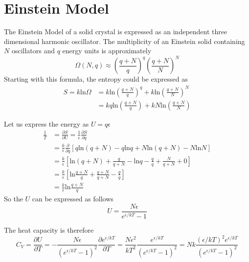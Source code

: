 
\section{Einstein Model}
The Einstein Model of a solid crystal is expressed as an independent three dimensional harmonic oscillator.
The multiplicity of an Einstein solid containing $N$ oscillators and $q$ energy units is approximately
\begin{equation} 
\Omega(N, q) \approx (\frac{q+N}{q})^q (\frac{q+N}{N})^N
\end{equation}
Starting with this formula, the entropy could be expressed as 
\begin{equation} 
\begin{split}
S = k\textrm{ln}\Omega &= k\textrm{ln}(\frac{q+N}{q})^q + k\textrm{ln}(\frac{q+N}{N})^N\\
                       &= kq\textrm{ln}(\frac{q+N}{q}) + kN\textrm{ln}(\frac{q+N}{N})
\end{split}
\end{equation}

Let us express the energy as $U = q\epsilon$ 
\begin{equation}
\begin{split}
\frac{1}{T} &= \frac{\partial S}{\partial U} = \frac{1}{\epsilon}\frac{\partial S}{\partial q} \\
            &= \frac{k}{\epsilon} \frac{\partial}{\partial q}[q\textrm{ln}(q+N) - q\textrm{ln}q + N\textrm{ln}(q+N) - N\textrm{ln}N] \\
            &= \frac{k}{\epsilon} [\textrm{ln}(q+N) + \frac{q}{q+N} - \textrm{ln}q  - \frac{q}{q} +  \frac{N}{q+N} + 0] \\
            &= \frac{k}{\epsilon} [\textrm{ln}\frac{q+N}{q} + \frac{q+N}{q+N} - \frac{q}{q}] \\
            &= \frac{k}{\epsilon} \textrm{ln}\frac{q+N}{q} 
\end{split}
\end{equation}
So the $U$ can be expressed as follows
\begin{equation}
U = \frac{N\epsilon}{e^{\epsilon/kT}-1}
\end{equation}

The heat capacity is therefore
\begin{equation}
C_V =  \frac{\partial U}{\partial T} 
    = -\frac{N\epsilon}{(e^{\epsilon/kT}-1)^2} \frac{\partial e^{\epsilon/kT}}{\partial T} 
    =  \frac{N\epsilon^2}{kT^2} \frac{e^{\epsilon/kT}}{(e^{\epsilon/kT}-1)^2}
    =  Nk \frac{ (\epsilon/kT)^2  e^{\epsilon/kT}}{(e^{\epsilon/kT}-1)^2}
\end{equation}

